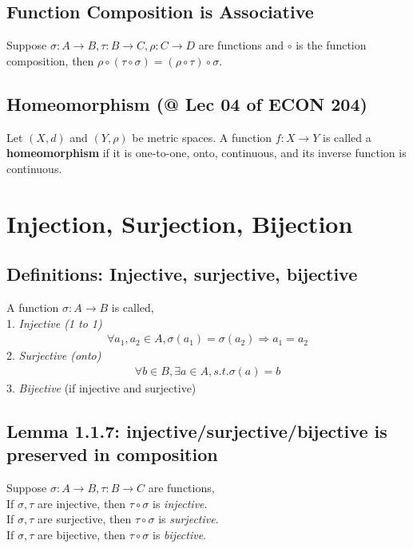 \documentclass[11pt]{elegantbook}
\begin{document}
\subsection{Function Composition is Associative}
\begin{proposition}
    Suppose $\sigma:A \rightarrow B, \tau:B \rightarrow C, \rho:C \rightarrow D$ are functions and $\circ$ is the function composition, then $\rho\circ(\tau\circ\sigma)=(\rho\circ\tau)\circ\sigma$.
\end{proposition}


\subsection{Homeomorphism \small{(@ Lec 04 of ECON 204)}}
\begin{definition}[Homeomorphism]
    \normalfont
    Let $(X, d)$ and $(Y, \rho)$ be metric spaces. A function $f : X \rightarrow Y$ is called a \textbf{homeomorphism} if it is one-to-one, onto, continuous, and its inverse function is continuous.
\end{definition}

\section{Injection, Surjection, Bijection}
\subsection{Definitions: Injective, surjective, bijective}
A function $\sigma:A \rightarrow B$ is called,\\
1. \textit{Injective (1 to 1)}
\begin{equation}
    \begin{aligned}
        \forall a_1,a_2\in A, \sigma(a_1)=\sigma(a_2)\Rightarrow a_1=a_2
    \end{aligned}
    \nonumber
\end{equation}
2. \textit{Surjective (onto)}
\begin{equation}
    \begin{aligned}
        \forall b\in B,\exists a\in A, s.t. \sigma(a)=b
    \end{aligned}
    \nonumber
\end{equation}
3. \textit{Bijective} (if injective and surjective)

\subsection{Lemma 1.1.7: injective/surjective/bijective is preserved in composition}
\begin{lemma}[Lemma 1.1.7]
    Suppose $\sigma:A \rightarrow B, \tau: B \rightarrow C$ are functions,\\
    If $\sigma, \tau$ are injective, then $\tau\circ\sigma$ is \textit{injective}.\\
    If $\sigma, \tau$ are surjective, then $\tau\circ\sigma$ is \textit{surjective}.\\
    If $\sigma, \tau$ are bijective, then $\tau\circ\sigma$ is \textit{bijective}.
\end{lemma}
\end{document}
